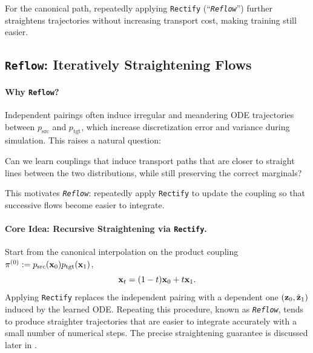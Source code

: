 For the canonical path, repeatedly applying \texttt{Rectify} (``\emph{\texttt{Reflow}}'') further straightens trajectories without increasing transport cost, making training still easier.




\subsection{\texttt{Reflow}: Iteratively Straightening Flows}\label{subsec:reflow-def}

\paragraph{Why \texttt{Reflow}?}
Independent pairings often induce irregular and meandering ODE trajectories between $p_{\text{src}}$ and $p_{\text{tgt}}$, which increase discretization error and variance during simulation. This raises a natural question:

\begin{question}\label{ques:straight}
Can we learn couplings that induce transport paths that are closer to straight lines between the two distributions, while still preserving the correct marginals?
\end{question}

This motivates \emph{\texttt{Reflow}}: repeatedly apply \texttt{Rectify} to update the coupling so that successive flows become easier to integrate.

\paragraph{Core Idea: Recursive Straightening via \texttt{Rectify}.}

Start from the canonical interpolation on the product coupling
$\pi^{(0)}:=p_{\text{src}}({\mathbf{x}}_0)p_{\text{tgt}}({\mathbf{x}}_1)$,
\[
{\mathbf{x}}_t=(1-t){\mathbf{x}}_0+t{\mathbf{x}}_1.
\]
Applying \texttt{Rectify} replaces the independent pairing with a dependent
one $({\mathbf{z}}_0,\hat{{\mathbf{z}}}_1)$ induced by the learned ODE. Repeating this procedure,
known as \emph{\texttt{Reflow}}, tends to produce straighter trajectories that
are easier to integrate accurately with a small number of numerical steps.
The precise straightening guarantee is discussed later in
.

